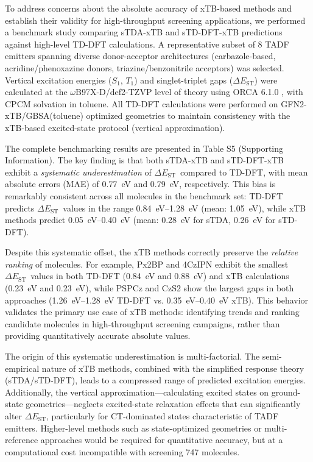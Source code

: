 \documentclass[journal=jcisd8,manuscript=article,keywords=true]{achemso}
\newcommand{\deltaest}{$\Delta E_{\text{ST}}$}
\begin{document}
To address concerns about the absolute accuracy of xTB-based methods and establish their validity for high-throughput screening applications, we performed a 
benchmark study comparing sTDA-xTB and sTD-DFT-xTB predictions against high-level TD-DFT calculations. A representative subset of 8 TADF emitters spanning 
diverse donor-acceptor architectures (carbazole-based, acridine/phenoxazine donors, triazine/benzonitrile acceptors) was selected. Vertical excitation energies 
($S_1$, $T_1$) and singlet-triplet gaps (\deltaest) were calculated at the $\omega$B97X-D/def2-TZVP level of theory using ORCA 6.1.0 \cite{Neese2020}, with 
CPCM 
solvation in toluene. All TD-DFT calculations were performed on GFN2-xTB/GBSA(toluene) optimized geometries to maintain consistency with the xTB-based 
excited-state protocol (vertical approximation).

The complete benchmarking results are presented in Table S5 (Supporting Information). The key finding is that both sTDA-xTB and sTD-DFT-xTB exhibit a 
\textit{systematic underestimation} of \deltaest\ compared to TD-DFT, with mean absolute errors (MAE) of \qty{0.77}{\electronvolt} and 
\qty{0.79}{\electronvolt}, respectively. This bias is remarkably consistent across all molecules in the benchmark set: TD-DFT predicts \deltaest\ values in the 
range \qtyrange{0.84}{1.28}{\electronvolt} (mean: \qty{1.05}{\electronvolt}), while xTB methods predict \qtyrange{0.05}{0.40}{\electronvolt} (mean: 
\qty{0.28}{\electronvolt} for sTDA, \qty{0.26}{\electronvolt} for sTD-DFT).

Despite this systematic offset, the xTB methods correctly preserve the \textit{relative ranking} of molecules. For example, Px2BP and 4CzIPN exhibit the 
smallest \deltaest\ values in both TD-DFT (\qty{0.84}{\electronvolt} and \qty{0.88}{\electronvolt}) and xTB calculations (\qty{0.23}{\electronvolt} and 
\qty{0.23}{\electronvolt}), while PSPCz and CzS2 show the largest gaps in both approaches (\qtyrange{1.26}{1.28}{\electronvolt} TD-DFT vs. \qtyrange{0.35}{0.40}{\electronvolt} xTB). This 
behavior validates the primary use case of xTB methods: identifying trends and ranking candidate molecules in high-throughput screening campaigns, rather than 
providing quantitatively accurate absolute values.

The origin of this systematic underestimation is multi-factorial. The semi-empirical nature of xTB methods, combined with the simplified response theory 
(sTDA/sTD-DFT), leads to a compressed range of predicted excitation energies. Additionally, the vertical approximation—calculating excited states on 
ground-state geometries—neglects excited-state relaxation effects that can significantly alter \deltaest, particularly for CT-dominated states characteristic 
of TADF emitters. Higher-level methods such as state-optimized geometries or multi-reference approaches would be required for quantitative accuracy, but at a 
computational cost incompatible with screening 747 molecules.
\end{document}
